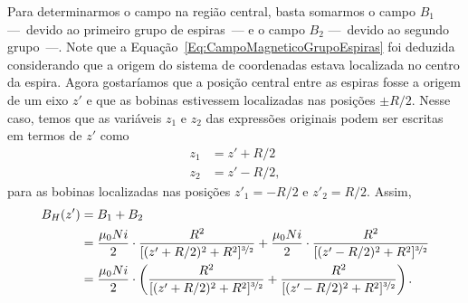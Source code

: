 Para determinarmos o campo na região central, basta somarmos o campo $B_1$ ---~devido ao primeiro grupo de espiras~--- e o campo $B_2$ ---~devido ao segundo grupo~---. Note que a Equação~\eqref{Eq:CampoMagneticoGrupoEspiras} foi deduzida considerando que a origem do sistema de coordenadas estava localizada no centro da espira. Agora gostaríamos que a posição central entre as espiras fosse a origem de um eixo $z'$ e que as bobinas estivessem localizadas nas posições $\pm R/2$. Nesse caso, temos que as variáveis $z_1$ e $z_2$ das expressões originais podem ser escritas em termos de $z'$ como
\begin{align}
    z_1 &= z' + R/2 \\
    z_2 &= z' - R/2,
\end{align}
%
para as bobinas localizadas nas posições $z'_1 = -R/2$ e $z'_2 = R/2$. Assim,
\begin{align}
    B_H(z') &= B_1 + B_2 \\
    &= \frac{\mu_0 N i}{2} \cdot \frac{R^2}{[(z' + R/2)^2 + R^2]^{\nicefrac{3}{2}}} + \frac{\mu_0 N i}{2} \cdot \frac{R^2}{[(z' - R/2)^2 + R^2]^{\nicefrac{3}{2}}} \\
    &= \frac{\mu_0 N i}{2} \cdot \left(\frac{R^2}{[(z' + R/2)^2 + R^2]^{\nicefrac{3}{2}}} + \frac{R^2}{[(z' - R/2)^2 + R^2]^{\nicefrac{3}{2}}}\right). \label{Eq:CampoMagneticoBobinasDeHelmholtz}
\end{align}

